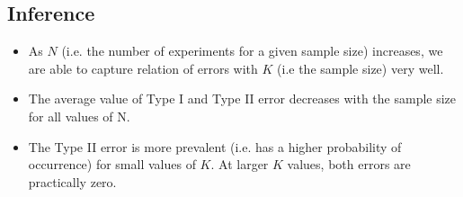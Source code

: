 \documentclass[fleqn, 11pt]{article}
\begin{document}
\subsection{Inference}
\begin{itemize}
    \item As $N$ (i.e. the number of experiments for a given sample size) increases, we are able to capture relation of errors with $K$ (i.e the sample size) very well.
    \item The average value of Type I and Type II error decreases with the sample size for all values of N.
    \item The Type II error is more prevalent (i.e. has a higher probability of occurrence) for small values of $K$. At larger $K$ values, both errors are practically zero.
\end{itemize}
\end{document}
